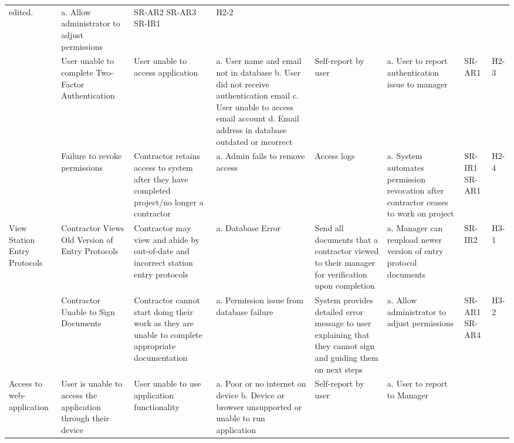 \documentclass{article}
\begin{document}
\begin{table}
{\begin{tabular}{|>{\raggedright}p{2.0cm}|>{\raggedright}p{2.0cm}|>{\raggedright}p{2.5cm}|>{\raggedright}p{4cm}|>{\raggedright}p{3cm}|>{\raggedright}p{4cm}|>{\raggedright}p{1.5cm}|p{1.5cm}|}
      edited. & a. Allow administrator to adjust permissions &
      SR-AR2 \newline SR-AR3 \newline SR-IR1 & H2-2 \\
      \cline{2-8}
      & User unable to complete Two-Factor Authentication & User
      unable to access application & a. User name and email not in
      database \newline b. User did not receive authentication email
      \newline c. User unable to access email account \newline d.
      Email address in database outdated or incorrect
      & Self-report by user & a. User to report authentication issue
      to manager & SR-AR1 & H2-3 \\
      \cline{2-8}
      & Failure to revoke permissions & Contractor retains access to system
      after they have completed project/no longer a contractor & a.
      Admin fails to
      remove access & Access logs & a. System automates permission
      revocation after
      contractor ceases to work on project & SR-IR1 \newline SR-AR1 & H2-4\\
      \hline
      View Station Entry Protocols & Contractor Views Old Version of
      Entry Protocols & Contractor may view and abide by out-of-date
      and incorrect station entry protocols & a. Database Error &
      Send all documents that a contractor viewed to their manager
      for verification upon completion & a. Manager can reupload
      newer version of entry protocol documents & SR-IR2 & H3-1 \\
      \cline{2-8}
      & Contractor Unable to Sign Documents & Contractor cannot start
      doing their work as they are unable to complete appropriate
      documentation & a. Permission issue from database failure &
      System provides detailed error message to user explaining that
      they cannot sign and guiding them on next steps & a. Allow
      administrator to adjust permissions & SR-AR1 \newline SR-AR4 & H3-2 \\
      \hline
      Access to web-application & User is unable to access the
      application through their device & User unable to use
      application functionality & a. Poor or no internet on device
      \newline b. Device or browser unsupported or unable to run application
      & Self-report by user & a. User to report to Manager \newline

\end{tabular}}
\end{table}
\end{document}
